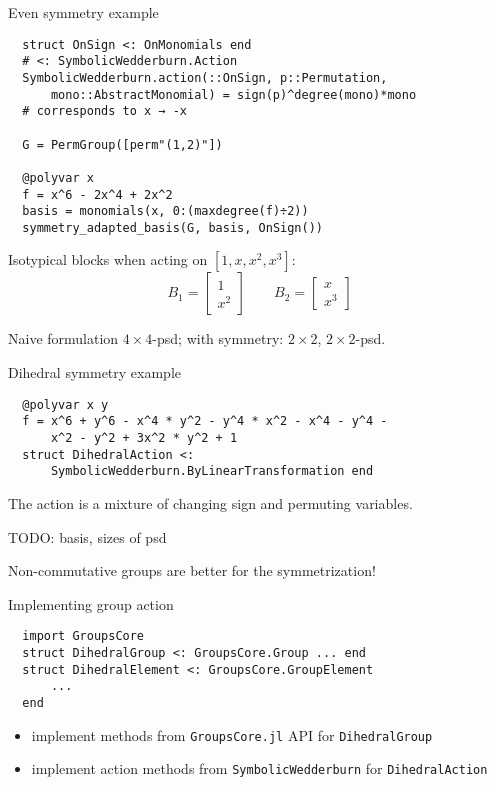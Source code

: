 \begin{frame}[fragile]{Even symmetry example}
\footnotesize
\begin{verbatim}
  struct OnSign <: OnMonomials end
  # <: SymbolicWedderburn.Action
  SymbolicWedderburn.action(::OnSign, p::Permutation, 
      mono::AbstractMonomial) = sign(p)^degree(mono)*mono
  # corresponds to x → -x
  
  G = PermGroup([perm"(1,2)"])
  
  @polyvar x
  f = x^6 - 2x^4 + 2x^2
  basis = monomials(x, 0:(maxdegree(f)÷2))
  symmetry_adapted_basis(G, basis, OnSign())  
\end{verbatim}

  Isotypical blocks when acting on $[1, x, x^2, x^3]$:
\[
  B_1 = \begin{bmatrix}
          1\\
          x^2
        \end{bmatrix}
  \qquad
  B_2 = \begin{bmatrix}
          x\\
          x^3
        \end{bmatrix}
\]

Naive formulation $4\times 4$-psd; with symmetry: $2\times 2$, $2\times 2$-psd.
\end{frame}

\begin{frame}[fragile]{Dihedral symmetry example}
\footnotesize
  \begin{verbatim}
  @polyvar x y
  f = x^6 + y^6 - x^4 * y^2 - y^4 * x^2 - x^4 - y^4 - 
      x^2 - y^2 + 3x^2 * y^2 + 1
  struct DihedralAction <: 
      SymbolicWedderburn.ByLinearTransformation end
  \end{verbatim}
  The action is a mixture of changing sign and permuting variables.

  TODO: basis,  sizes of psd
  
  Non-commutative groups are better for the symmetrization!
  
\end{frame}

\begin{frame}[fragile]{Implementing group action}
\footnotesize

  \begin{verbatim}
  import GroupsCore
  struct DihedralGroup <: GroupsCore.Group ... end
  struct DihedralElement <: GroupsCore.GroupElement
      ...
  end
  \end{verbatim}
\normalsize
  \begin{itemize}
    \item implement methods from \texttt{GroupsCore.jl} API for \texttt{DihedralGroup}
    \item implement action methods from \texttt{SymbolicWedderburn} for \texttt{DihedralAction}
  \end{itemize}
\end{frame}

